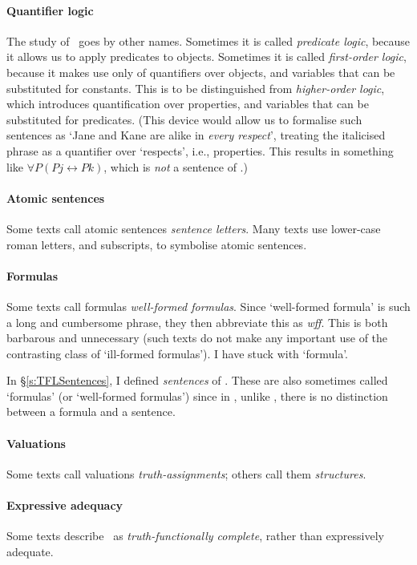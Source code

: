 \paragraph{Quantifier logic} The study of \FOL\ goes by other names. Sometimes it is called \emph{predicate logic}, because it allows us to apply  predicates to objects. Sometimes it is called \emph{first-order logic}, because it makes use only of quantifiers over objects, and variables that can be substituted for constants. This is to be distinguished from \emph{higher-order logic}, which introduces quantification over properties, and variables that can be substituted for predicates. (This device would allow us to formalise such sentences as `Jane and Kane are alike in \emph{every respect}', treating the italicised phrase as a quantifier over `respects', i.e., properties. This results in something like $\forall P (Pj \leftrightarrow Pk)$, which is \emph{not} a sentence of \FOL.)

\paragraph{Atomic sentences} Some texts call atomic sentences \emph{sentence letters}. Many texts use lower-case roman letters, and subscripts, to symbolise atomic sentences.

\paragraph{Formulas} Some texts call formulas \emph{well-formed formulas}. Since `well-formed formula' is such a long and cumbersome phrase, they then abbreviate this as \emph{wff}. This is both barbarous and unnecessary (such texts do not make any important use of the contrasting class of `ill-formed formulas'). I have stuck with `formula'. 

In §\ref{s:TFLSentences}, I defined \emph{sentences} of \TFL. These are also sometimes called `formulas' (or `well-formed formulas') since in \TFL, unlike \FOL, there is no distinction between a formula and a sentence.

\paragraph{Valuations} Some texts call valuations \emph{truth-assignments}; others call them \emph{structures}.

\paragraph{Expressive adequacy} Some texts describe \TFL\ as \emph{truth-functionally complete}, rather than expressively adequate. 


